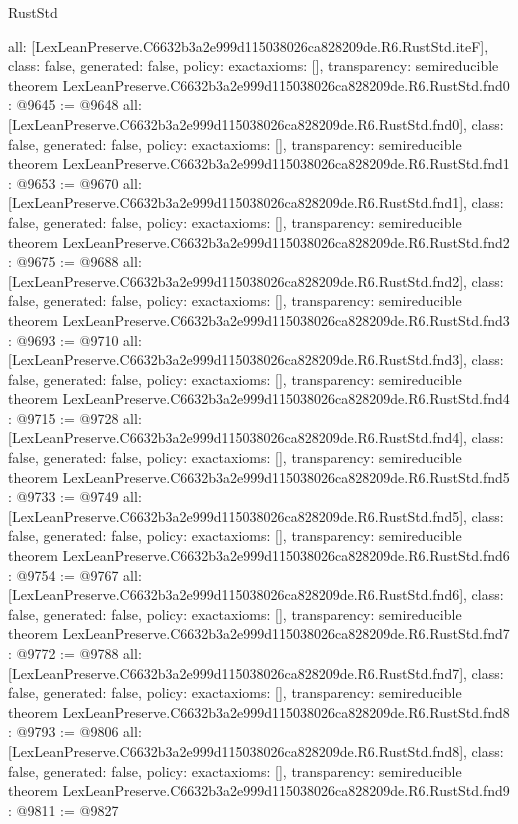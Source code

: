 \begin{lexlean}{RustStd}
\begin{coremodule}
{  all: [LexLeanPreserve.C6632b3a2e999d115038026ca828209de.R6.RustStd.iteF],
  class: false,
  generated: false,
  policy: exact{axioms: []},
  transparency: semireducible
}
theorem LexLeanPreserve.C6632b3a2e999d115038026ca828209de.R6.RustStd.fnd0 : @9645 := @9648 {
  all: [LexLeanPreserve.C6632b3a2e999d115038026ca828209de.R6.RustStd.fnd0],
  class: false,
  generated: false,
  policy: exact{axioms: []},
  transparency: semireducible
}
theorem LexLeanPreserve.C6632b3a2e999d115038026ca828209de.R6.RustStd.fnd1 : @9653 := @9670 {
  all: [LexLeanPreserve.C6632b3a2e999d115038026ca828209de.R6.RustStd.fnd1],
  class: false,
  generated: false,
  policy: exact{axioms: []},
  transparency: semireducible
}
theorem LexLeanPreserve.C6632b3a2e999d115038026ca828209de.R6.RustStd.fnd2 : @9675 := @9688 {
  all: [LexLeanPreserve.C6632b3a2e999d115038026ca828209de.R6.RustStd.fnd2],
  class: false,
  generated: false,
  policy: exact{axioms: []},
  transparency: semireducible
}
theorem LexLeanPreserve.C6632b3a2e999d115038026ca828209de.R6.RustStd.fnd3 : @9693 := @9710 {
  all: [LexLeanPreserve.C6632b3a2e999d115038026ca828209de.R6.RustStd.fnd3],
  class: false,
  generated: false,
  policy: exact{axioms: []},
  transparency: semireducible
}
theorem LexLeanPreserve.C6632b3a2e999d115038026ca828209de.R6.RustStd.fnd4 : @9715 := @9728 {
  all: [LexLeanPreserve.C6632b3a2e999d115038026ca828209de.R6.RustStd.fnd4],
  class: false,
  generated: false,
  policy: exact{axioms: []},
  transparency: semireducible
}
theorem LexLeanPreserve.C6632b3a2e999d115038026ca828209de.R6.RustStd.fnd5 : @9733 := @9749 {
  all: [LexLeanPreserve.C6632b3a2e999d115038026ca828209de.R6.RustStd.fnd5],
  class: false,
  generated: false,
  policy: exact{axioms: []},
  transparency: semireducible
}
theorem LexLeanPreserve.C6632b3a2e999d115038026ca828209de.R6.RustStd.fnd6 : @9754 := @9767 {
  all: [LexLeanPreserve.C6632b3a2e999d115038026ca828209de.R6.RustStd.fnd6],
  class: false,
  generated: false,
  policy: exact{axioms: []},
  transparency: semireducible
}
theorem LexLeanPreserve.C6632b3a2e999d115038026ca828209de.R6.RustStd.fnd7 : @9772 := @9788 {
  all: [LexLeanPreserve.C6632b3a2e999d115038026ca828209de.R6.RustStd.fnd7],
  class: false,
  generated: false,
  policy: exact{axioms: []},
  transparency: semireducible
}
theorem LexLeanPreserve.C6632b3a2e999d115038026ca828209de.R6.RustStd.fnd8 : @9793 := @9806 {
  all: [LexLeanPreserve.C6632b3a2e999d115038026ca828209de.R6.RustStd.fnd8],
  class: false,
  generated: false,
  policy: exact{axioms: []},
  transparency: semireducible
}
theorem LexLeanPreserve.C6632b3a2e999d115038026ca828209de.R6.RustStd.fnd9 : @9811 := @9827 {
}
\end{coremodule}
\end{lexlean}
